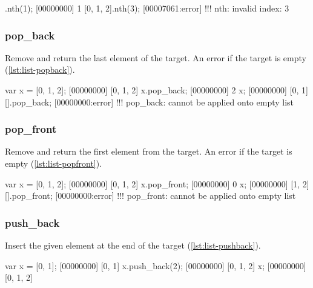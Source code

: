 \begin{urbiscript}[caption=List.nth, label=lst:list-nth, float=\floatposh]
  [0, 1, 2].nth(1);
  [00000000] 1
  [0, 1, 2].nth(3);
  [00007061:error] !!! nth: invalid index: 3
\end{urbiscript}

\subsubsection{pop\_back}

Remove and return the last element of the target. An error if the
target is empty (\autoref{lst:list-popback}).

\begin{urbiscript}[caption=List.pop\_back, label=lst:list-popback, float=\floatposh]
  var x = [0, 1, 2];
  [00000000] [0, 1, 2]
  x.pop_back;
  [00000000] 2
  x;
  [00000000] [0, 1]
  [].pop_back;
  [00000000:error] !!! pop_back: cannot be applied onto empty list
\end{urbiscript}

\subsubsection{pop\_front}

Remove and return the first element from the target. An error if the
target is empty (\autoref{lst:list-popfront}).

\begin{urbiscript}[caption=List.pop\_front, label=lst:list-popfront, float=\floatposh]
  var x = [0, 1, 2];
  [00000000] [0, 1, 2]
  x.pop_front;
  [00000000] 0
  x;
  [00000000] [1, 2]
  [].pop_front;
  [00000000:error] !!! pop_front: cannot be applied onto empty list
\end{urbiscript}

\subsubsection{push\_back}
\label{sec:std-list-pushback}

Insert the given element at the end of the target
(\autoref{lst:list-pushback}).

\begin{urbiscript}[caption=List.push\_back, label=lst:list-pushback, float=\floatposh]
  var x = [0, 1];
  [00000000] [0, 1]
  x.push_back(2);
  [00000000] [0, 1, 2]
  x;
  [00000000] [0, 1, 2]
\end{urbiscript}

